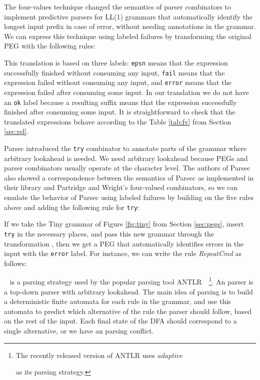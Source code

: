\documentclass[3p,12pt,singlecolumn]{elsarticle}
\begin{document}
The four-values technique changed the semantics
of parser combinators to implement predictive parsers for LL(1)
grammars that automatically identify the longest input prefix
in case of error, without needing annotations in the grammar.
We can express this technique using labeled failures by transforming
the original PEG with the following rules:


This translation is based on three labels:
\texttt{epsn} means that the expression successfully finished
without consuming any input,
\texttt{fail} means that the expression failed without consuming
any input,
and \texttt{error} means that the expression failed after
consuming some input.
In our translation we do not have an \texttt{ok} label because a
resulting suffix means that the expression successfully finished
after consuming some input.
It is straightforward to check that the translated expressions
behave according to the Table \ref{tab:fv} from Section \ref{sec:rel}.

Parsec introduced the \texttt{try} combinator to annotate parts of the
grammar where arbitrary lookahead is needed.
We need arbitrary lookahead because PEGs and parser combinators usually
operate at the character level.
The authors of Parsec also showed a correspondence between the semantics
of Parsec as implemented in their library and Partridge and Wright's
four-valued combinators,
so we can emulate the behavior of Parsec using labeled failures by
building on the five rules above and adding the following rule for
\texttt{try}:


If we take the Tiny grammar of Figure \ref{fig:tiny} from
Section \ref{sec:pegs}, insert \texttt{try} in the necessary places,
and pass this new grammar through the transformation
, then we get a PEG that automatically
identifies errors in the input with the \texttt{error} label.
For instance, we can write the rule \textit{RepeatCmd} as follows:


~\cite{parr2011llstar} is a parsing strategy used by
the popular parsing tool ANTLR~\cite{parr2013antlr,antlrsite}~\footnote{The
recently released version  of ANTLR uses {\em adaptive}
 
as its parsing strategy.}. An  parser is a top-down
parser with arbitrary lookahead. The main idea of 
parsing is to build a deterministic finite automata for
each rule in the grammar, and use this automata to predict
which alternative of the rule the parser should follow,
based on the rest of the input. Each final state of
the DFA should correspond to a single alternative, or
we have an  parsing conflict. 
\end{document}
